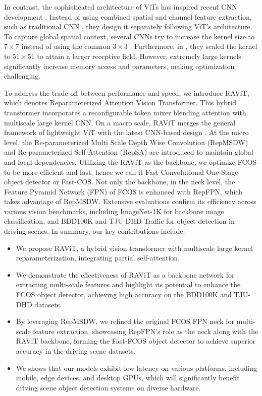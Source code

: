In contrast, the sophisticated architecture of ViTs has inspired recent CNN development \cite{liu2022convnet, vasu2023fastvit, wang2024repvit}. Instead of using combined spatial and channel feature extraction, such as traditional CNN \cite{howard2019searching, sandler2018mobilenetv2}, they design it separately following ViT's architecture. To capture global spatial context, several CNNs try to increase the kernel size to $7 \times 7$ \cite{liu2022convnet, vasu2023fastvit}  instead of using the common $3 \times 3$ \cite{wang2024repvit}. Furthermore, in \cite{ding2022scaling, liu2022more}, they scaled the kernel to $51 \times 51$ to attain a larger receptive field. However, extremely large kernels significantly increase memory access and parameters, making optimization challenging.

To address the trade-off between performance and speed, we introduce RAViT, which denotes Reparameterized Attention Vision Transformer. This hybrid transformer incorporates a reconfigurable token mixer blending attention with multiscale large kernel CNN. On a macro scale, RAViT merges the general framework of lightweight ViT \cite{graham2021levit, liu2023efficientvit, yun2024shvit} with the latest CNN-based design \cite{wang2024repvit}. At the micro level, the Re-parameterized Multi Scale Depth Wise Convolution (RepMSDW) and Re-parameterized Self-Attention (RepSA) are introduced to maintain global and local dependencies. Utilizing the RAViT as the backbone, we optimize FCOS to be more efficient and fast, hence we call it Fast Convolutional One-Stage object detector or Fast-COS. Not only the backbone, in the neck level, the Feature Pyramid Network (FPN) of FCOS is enhanced with RepFPN, which takes advantage of RepMSDW. Extensive evaluations confirm its efficiency across various vision benchmarks, including ImageNet-1K for backbone image classification, and BDD100K and TJU-DHD Traffic for object detection in driving scenes. In summary, our key contributions include:
\begin{itemize}
    \item We propose RAViT, a hybrid vision transformer with multiscale large kernel reparameterization, integrating partial self-attention.
    \item We demonstrate the effectiveness of RAViT as a backbone network for extracting multi-scale features and highlight its potential to enhance the FCOS object detector, achieving high accuracy on the BDD100K and TJU-DHD datasets.
    \item By leveraging RepMSDW, we refined the original FCOS FPN neck for multi-scale feature extraction, showcasing RepFPN's role as the neck along with the RAViT backbone, forming the Fast-FCOS object detector to achieve superior accuracy in the driving scene datasets.
    \item We shows that our models exhibit low latency on various platforms, including mobile, edge devices, and desktop GPUs, which will significantly benefit driving scene object detection systems on diverse hardware.
\end{itemize}


